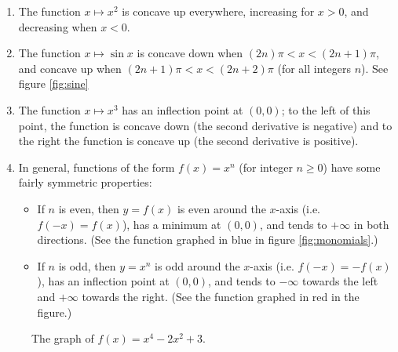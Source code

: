 \begin{exs}
  \begin{enumerate}
    \item The function $ x \mapsto x^2 $ is concave up everywhere, increasing for $ x > 0 $, and decreasing when $ x < 0 $.
    \item The function $ x \mapsto \sin x $ is concave down when $ (2n)\pi < x < (2n + 1)\pi $, and concave up when $ (2n + 1)\pi < x < (2n + 2)\pi $
          (for all integers $ n $). See figure \ref{fig:sine}
    \item The function $ x \mapsto x^3 $ has an inflection point at $ (0,0) $; to the left of this point, the function is concave
          down (the second derivative is negative) and to the right the function is concave up (the second derivative is positive).
    \item In general, functions of the form $ f(x) = x^n $ (for integer $ n \geq 0 $) have some fairly symmetric properties:
      \begin{itemize}
        \item If $ n $ is even, then $ y = f(x) $ is even around the $ x $-axis (i.e. $ f(-x) = f(x) $), has a minimum at $ (0,0) $, and
              tends to $ +\infty $ in both directions. (See the function graphed in blue in figure \ref{fig:monomials}.)
        \item If $ n $ is odd, then $ y = x^n $ is odd around the $ x $-axis (i.e. $ f(-x) = -f(x) $), has an inflection point at $ (0,0) $,
              and tends to $ -\infty $ towards the left and $ +\infty $ towards the right. (See the function graphed in red in the figure.)
      \end{itemize}
  \end{enumerate}
\end{exs}

\begin{figure}
  \centering
  \caption{The graph of $ f(x) = x^4 - 2x^2 + 3 $.\label{fig:poly9}}
\end{figure}

